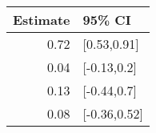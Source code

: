 \begin{tabular}{rl}
  \hline
Estimate & 95\% CI \\ 
  \hline
0.72 & [0.53,0.91] \\ 
  0.04 & [-0.13,0.2] \\ 
  0.13 & [-0.44,0.7] \\ 
  0.08 & [-0.36,0.52] \\ 
   \hline
\end{tabular}

